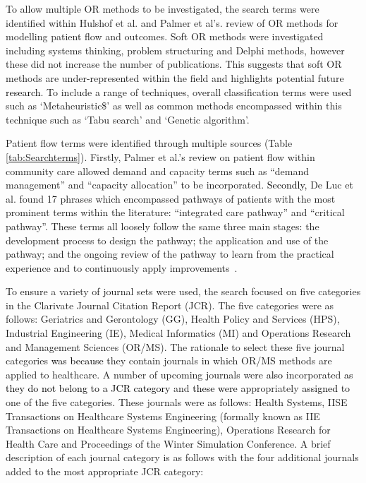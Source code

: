 \documentclass[../thesis.tex]{subfiles}
\begin{document}
To allow multiple OR methods to be investigated, the search terms were identified within Hulshof et al. \cite{PHulshof} and Palmer et al's. \cite{RPalmer} review of OR methods for modelling patient flow and outcomes. Soft OR methods were investigated including \textcolor{black}{s}ystems thinking, problem structuring and Delphi methods, however these did not increase the number of publications. This suggests that soft OR methods are under-represented within the field and highlights potential future \textcolor{black}{research}. To include a range of techniques, overall classification terms were used such as `Metaheuristic\$' as well as common methods encompassed within this technique such as `Tabu search' and `Genetic algorithm'.

Patient flow terms were identified through multiple sources (Table \ref{tab:Searchterms}). Firstly, Palmer et al.'s \cite{RPalmer} review on patient flow within community care allowed demand and capacity terms such as ``demand management'' and ``capacity allocation'' to be incorporated. \textcolor{black}{Secondly,} De Luc et al. \cite{DLuc} found 17 phrases which encompassed pathways of patients with the most prominent terms within the literature\textcolor{black}{:} ``integrated care pathway'' and ``critical pathway''. These terms all loosely follow the same three main stages\textcolor{black}{:} the development process to design the pathway\textcolor{black}{;} the application and use of the pathway\textcolor{black}{;} and the ongoing review of the pathway to learn from the practical experience and to continuously apply improvements~\cite{DLuc, DKitchiner}. 


To ensure a variety of journal sets were used, the search focused on five categories in the Clarivate Journal Citation Report (JCR). The five categories were as follows: Geriatrics and Gerontology (GG), Health Policy and Services (HPS), Industrial Engineering (IE), Medical Informatics (MI) and Operations Research and Management Sciences (OR/MS). The rationale to select these five journal categories \textcolor{black}{was because} they contain journals in which OR/MS methods are applied to healthcare. A number of upcoming journals were \textcolor{black}{also} incorporated \textcolor{black}{as they do not belong to a JCR category} and \textcolor{black}{these were} appropriately \textcolor{black}{assigned} to one of the five categories. These journals were as follows: Health Systems, IISE Transactions on Healthcare Systems Engineering (formally known as IIE Transactions on Healthcare Systems Engineering), Operations Research for Health Care and Proceedings of the Winter Simulation Conference. A brief description of each journal category is as follows with the four additional journals added to the most appropriate JCR category:
\end{document}
